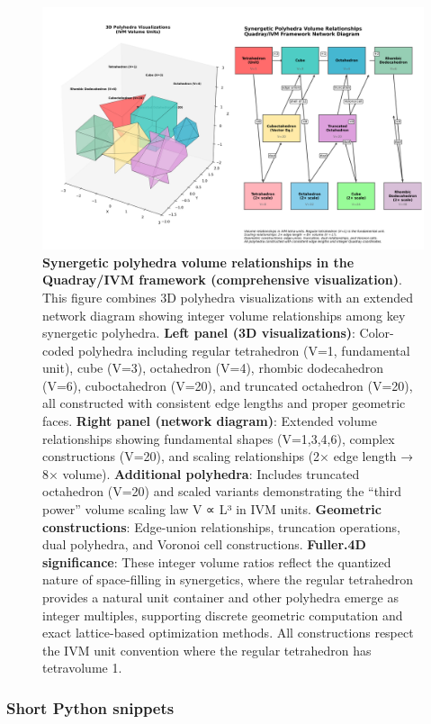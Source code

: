 \documentclass[
  10pt,
]{article}
\begin{document}
\begin{figure}
\centering
\includegraphics{../output/figures/polyhedra_quadray_constructions.png}
\caption{\textbf{Synergetic polyhedra volume relationships in the
Quadray/IVM framework (comprehensive visualization)}. This figure
combines 3D polyhedra visualizations with an extended network diagram
showing integer volume relationships among key synergetic polyhedra.
\textbf{Left panel (3D visualizations)}: Color-coded polyhedra including
regular tetrahedron (V=1, fundamental unit), cube (V=3), octahedron
(V=4), rhombic dodecahedron (V=6), cuboctahedron (V=20), and truncated
octahedron (V=20), all constructed with consistent edge lengths and
proper geometric faces. \textbf{Right panel (network diagram)}: Extended
volume relationships showing fundamental shapes (V=1,3,4,6), complex
constructions (V=20), and scaling relationships (2× edge length → 8×
volume). \textbf{Additional polyhedra}: Includes truncated octahedron
(V=20) and scaled variants demonstrating the ``third power'' volume
scaling law V ∝ L³ in IVM units. \textbf{Geometric constructions}:
Edge-union relationships, truncation operations, dual polyhedra, and
Voronoi cell constructions. \textbf{Fuller.4D significance}: These
integer volume ratios reflect the quantized nature of space-filling in
synergetics, where the regular tetrahedron provides a natural unit
container and other polyhedra emerge as integer multiples, supporting
discrete geometric computation and exact lattice-based optimization
methods. All constructions respect the IVM unit convention where the
regular tetrahedron has tetravolume 1.}
\end{figure}

\hypertarget{short-python-snippets}{%
\subsubsection{Short Python snippets}\label{short-python-snippets}}
\end{document}
